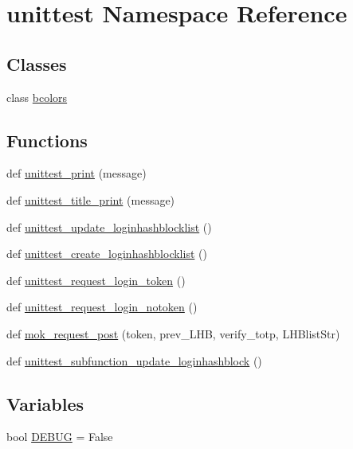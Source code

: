\hypertarget{namespaceunittest}{}\section{unittest Namespace Reference}
\label{namespaceunittest}
\subsection*{Classes}
\begin{DoxyCompactItemize}
\item 
class \hyperlink{classunittest_1_1bcolors}{bcolors}
\end{DoxyCompactItemize}
\subsection*{Functions}
\begin{DoxyCompactItemize}
\item 
def \hyperlink{namespaceunittest_a217a1a3af5bc9748f2f6194bf79402bc}{unittest\+\_\+print} (message)
\item 
def \hyperlink{namespaceunittest_a642ec5401fe406315f1489d237ba826e}{unittest\+\_\+title\+\_\+print} (message)
\item 
def \hyperlink{namespaceunittest_a9e16eaba67b93461be6ea8ef6332507a}{unittest\+\_\+update\+\_\+loginhashblocklist} ()
\item 
def \hyperlink{namespaceunittest_a0e10bea14aac2cc6a08d76f422b9328d}{unittest\+\_\+create\+\_\+loginhashblocklist} ()
\item 
def \hyperlink{namespaceunittest_aa1c9f3b8631f7f60770414cf8958e2be}{unittest\+\_\+request\+\_\+login\+\_\+token} ()
\item 
def \hyperlink{namespaceunittest_a8b30a1b14f91e9e9d093c13a7e68ee93}{unittest\+\_\+request\+\_\+login\+\_\+notoken} ()
\item 
def \hyperlink{namespaceunittest_afeccd95cc658ca5f2ffb4df7a1edbbd2}{mok\+\_\+request\+\_\+post} (token, prev\+\_\+\+L\+HB, verify\+\_\+totp, L\+H\+Blist\+Str)
\item 
def \hyperlink{namespaceunittest_a67d37c181ab73d9ac88a67b2f9ff2297}{unittest\+\_\+subfunction\+\_\+update\+\_\+loginhashblock} ()
\end{DoxyCompactItemize}
\subsection*{Variables}
\begin{DoxyCompactItemize}
\item 
bool \hyperlink{namespaceunittest_a6f95c254ae4668ea73efe6cf7ca3c36d}{D\+E\+B\+UG} = False
\end{DoxyCompactItemize}


